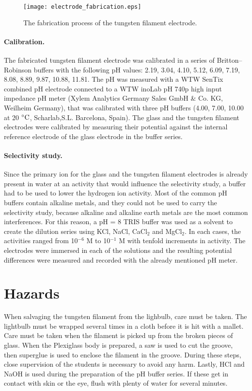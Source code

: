 \documentclass[manuscript=article, journal=jceda8]{achemso}
\begin{document}
\begin{figure}
\centering
\texttt{[image: electrode\_fabrication.eps]}
\caption{The fabrication process of the tungsten filament electrode. }
\label{fig:fabrication}
\end{figure}

\paragraph{Calibration.}

The fabricated tungsten filament electrode was calibrated in a series of Britton--Robinson buffers with the following pH values: 2.19, 3.04, 4.10, 5.12, 6.09, 7.19, 8.08, 8.89, 9.87, 10.88, 11.81. The pH was measured with a WTW SenTix combined pH electrode connected to a WTW inoLab pH 740p high input impedance pH meter (Xylem Analytics Germany Sales GmbH \& Co. KG, Weilheim Germany), that was calibrated with three pH buffers (4.00, 7.00, 10.00 at 20 $\celsius$, Scharlab,S.L. Barcelona, Spain). The glass and the tungsten filament electrodes were calibrated by measuring their potential against the internal reference electrode of the glass electrode in the buffer series. 


\paragraph{Selectivity study.}

Since the primary ion for the glass and the tungsten filament electrodes is already present in water at an activity that would influence the selectivity study, a buffer had to be used to lower the hydrogen ion activity. Most of the common pH buffers contain alkaline metals, and they could not be used to carry the selectivity study, because alkaline and alkaline earth metals are the most common interferences. For this reason, a pH = 8 TRIS buffer was used as a solvent to create the dilution series using KCl, NaCl, CaCl$_2$ and MgCl$_2$. In each cases, the activities ranged from 10$^{-6}$ M to 10$^{-1}$ M with tenfold increments in activity. The electrodes were immersed in each of the solutions and the resulting potential differences were measured and recorded with the already mentioned pH meter.

\section{Hazards}
When salvaging the tungsten filament from the lighbulb, care must be taken. The lightbulb must be wrapped several times in a cloth before it is hit with a mallet. Care must be taken when the filament is picked up from the broken pieces of glass. When the Plexiglass body is prepared, a saw is used to cut the groove, then superglue is used to enclose the filament in the groove. During these steps, close supervision of the students is necessary to avoid any harm. Lastly, HCl and NaOH is used during the preparation of the pH buffer series. If these get in contact with skin or the eye, flush with plenty of water for several minutes.
\end{document}
